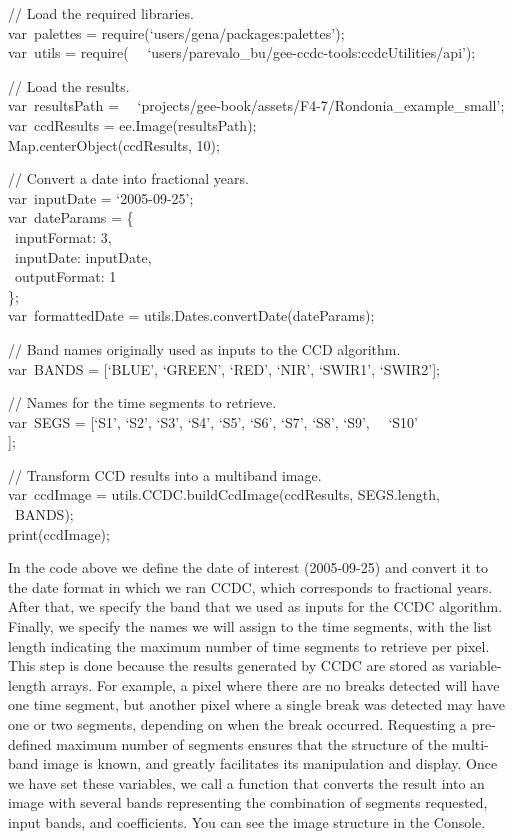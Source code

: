 \documentclass[
  letterpaper,
  DIV=11,
  numbers=noendperiod]{scrreprt}
\begin{document}
// Load the required libraries.\\
var~palettes = require(`users/gena/packages:palettes');\\
var~utils = require(~
~`users/parevalo\_bu/gee-ccdc-tools:ccdcUtilities/api');

// Load the results.\\
var~resultsPath =~
~`projects/gee-book/assets/F4-7/Rondonia\_example\_small';\\
var~ccdResults = ee.Image(resultsPath);\\
Map.centerObject(ccdResults, 10);

// Convert a date into fractional years.\\
var~inputDate = `2005-09-25';\\
var~dateParams = \{\\
\hspace*{0.333em} ~inputFormat: 3,\\
\hspace*{0.333em} ~inputDate: inputDate,\\
\hspace*{0.333em} ~outputFormat: 1\\
\};\\
var~formattedDate = utils.Dates.convertDate(dateParams);

// Band names originally used as inputs to the CCD algorithm.\\
var~BANDS = {[}`BLUE', `GREEN', `RED', `NIR', `SWIR1', `SWIR2'{]};

// Names for the time segments to retrieve.\\
var~SEGS = {[}`S1', `S2', `S3', `S4', `S5', `S6', `S7', `S8', `S9',~
~`S10'\\
{]};

// Transform CCD results into a multiband image.\\
var~ccdImage = utils.CCDC.buildCcdImage(ccdResults, SEGS.length,\\
\hspace*{0.333em} ~BANDS);\\
print(ccdImage);

In the code above we define the date of interest (2005-09-25) and
convert it to the date format in which we ran CCDC, which corresponds to
fractional years. After that, we specify the band that we used as inputs
for the CCDC algorithm. Finally, we specify the names we will assign to
the time segments, with the list length indicating the maximum number of
time segments to retrieve per pixel. This step is done because the
results generated by CCDC are stored as variable-length arrays. For
example, a pixel where there are no breaks detected will have one time
segment, but another pixel where a single break was detected may have
one or two segments, depending on when the break occurred. Requesting a
pre-defined maximum number of segments ensures that the structure of the
multi-band image is known, and greatly facilitates its manipulation and
display. Once we have set these variables, we call a function that
converts the result into an image with several bands representing the
combination of segments requested, input bands, and coefficients. You
can see the image structure in the Console.
\end{document}
